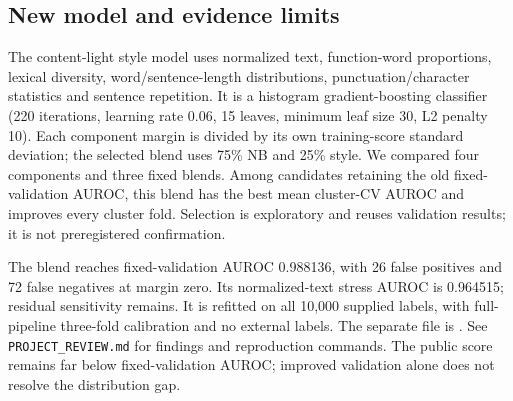 \subsection*{New model and evidence limits}
The content-light style model uses normalized text, function-word proportions, lexical diversity, word/sentence-length distributions, punctuation/character statistics and sentence repetition. It is a histogram gradient-boosting classifier (220 iterations, learning rate 0.06, 15 leaves, minimum leaf size 30, L2 penalty 10). Each component margin is divided by its own training-score standard deviation; the selected blend uses 75\% NB and 25\% style. We compared four components and three fixed blends. Among candidates retaining the old fixed-validation AUROC, this blend has the best mean cluster-CV AUROC and improves every cluster fold. Selection is exploratory and reuses validation results; it is not preregistered confirmation.

The blend reaches fixed-validation AUROC 0.988136, with 26 false positives and 72 false negatives at margin zero. Its normalized-text stress AUROC is 0.964515; residual sensitivity remains. It is refitted on all 10,000 supplied labels, with full-pipeline three-fold calibration and no external labels. The separate file is . See \texttt{PROJECT\_REVIEW.md} for findings and reproduction commands. The public score remains far below fixed-validation AUROC; improved validation alone does not resolve the distribution gap.
\endgroup
